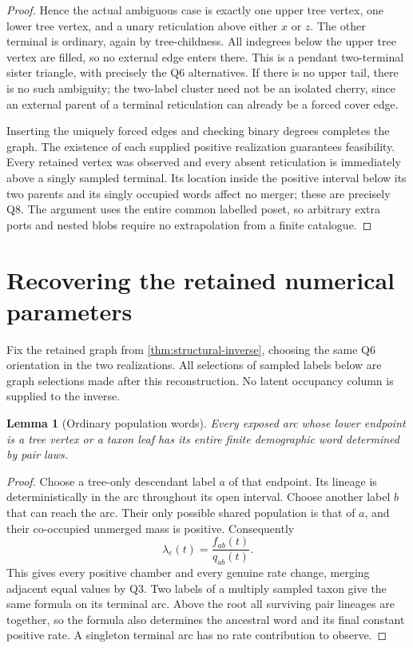 \documentclass[11pt]{article}
\newtheorem{lemma}[theorem]{Lemma}
\begin{document}
\begin{proof}
Hence the actual ambiguous case is exactly one upper tree vertex, one lower
tree vertex, and a unary reticulation above either $x$ or $z$.  The other
terminal is ordinary, again by tree-childness.  All indegrees below the
upper tree vertex are filled, so no external edge enters there.  This is a
pendant two-terminal sister triangle, with precisely the Q6 alternatives.
If there is no upper tail, there is no such ambiguity; the two-label cluster
need not be an isolated cherry, since an external parent of a terminal
reticulation can already be a forced cover edge.

Inserting the uniquely forced edges and checking binary degrees completes
the graph.  The existence of each supplied positive realization guarantees
feasibility.  Every retained vertex was observed and every absent
reticulation is immediately above a singly sampled terminal.  Its location
inside the positive interval below its two parents and its singly occupied
words affect no merger; these are precisely Q8.  The argument uses the
entire common labelled poset, so arbitrary extra ports and nested blobs
require no extrapolation from a finite catalogue.
\end{proof}

\section{Recovering the retained numerical parameters}
\label{sec:numerical-inverse}

Fix the retained graph from \cref{thm:structural-inverse}, choosing the same
Q6 orientation in the two realizations.  All selections of sampled labels
below are graph selections made after this reconstruction.  No latent
occupancy column is supplied to the inverse.

\begin{lemma}[Ordinary population words]
\label{lem:ordinary-words}
Every exposed arc whose lower endpoint is a tree vertex or a taxon leaf has
its entire finite demographic word determined by pair laws.
\end{lemma}
\begin{proof}
Choose a tree-only descendant label $a$ of that endpoint.  Its lineage is
deterministically in the arc throughout its open interval.  Choose another
label $b$ that can reach the arc.  Their only possible shared population is
that of $a$, and their co-occupied unmerged mass is positive.  Consequently
\[
 \lambda_e(t)=\frac{f_{ab}(t)}{q_{ab}(t)}.
\]
This gives every positive chamber and every genuine rate change, merging
adjacent equal values by Q3.  Two labels of a multiply sampled taxon give
the same formula on its terminal arc.  Above the root all surviving pair
lineages are together, so the formula also determines the ancestral word
and its final constant positive rate.  A singleton terminal arc has no
rate contribution to observe.
\end{proof}
\end{document}
